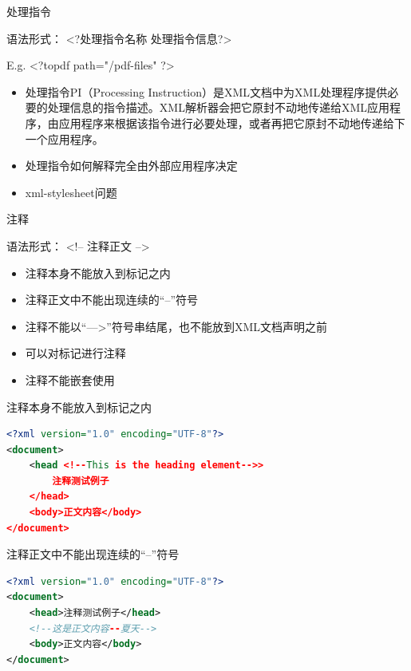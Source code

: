 \begin{frame}{处理指令}
\begin{shaded}
\par 语法形式： <?处理指令名称 处理指令信息?>
\par E.g. <?topdf path="/pdf-files" ?>
\end{shaded}

\begin{itemize}
\item 处理指令PI（Processing Instruction）是XML文档中为XML处理程序提供必要的处理信息的指令描述。XML解析器会把它原封不动地传递给XML应用程序，由应用程序来根据该指令进行必要处理，或者再把它原封不动地传递给下一个应用程序。
\item  处理指令如何解释完全由外部应用程序决定
\item xml-stylesheet问题
\end{itemize}
\end{frame}


\begin{frame}{注释}
\begin{shaded}
\par 语法形式： <!-- 注释正文 -->
\end{shaded}

\begin{itemize}
\item 注释本身不能放入到标记之内
\item  注释正文中不能出现连续的“--”符号
\item 注释不能以“--->”符号串结尾，也不能放到XML文档声明之前
\item 可以对标记进行注释
\item 注释不能嵌套使用
\end{itemize}
\end{frame}


\begin{frame}[fragile]{注释本身不能放入到标记之内}
\begin{lstlisting}[tabsize=8, basicstyle=\small\tt, language=XML]
<?xml version="1.0" encoding="UTF-8"?>
<document>
    <head <!--This is the heading element-->>
        注释测试例子
    </head>
    <body>正文内容</body>
</document>
\end{lstlisting}
\end{frame}


\begin{frame}[fragile]{注释正文中不能出现连续的“--”符号}
\begin{lstlisting}[tabsize=8, basicstyle=\small\tt, language=XML]
<?xml version="1.0" encoding="UTF-8"?>
<document>
    <head>注释测试例子</head>
    <!--这是正文内容--夏天-->
    <body>正文内容</body>
</document>
\end{lstlisting}
\end{frame}



